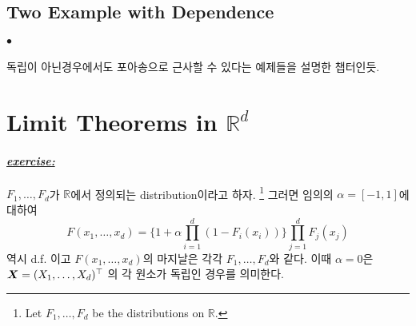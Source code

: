 \documentclass[12pt,oneside,english,a4paper]{article}
\def\ck{\paragraph{\Large$\bullet$}\Large}
\newcommand{\para}[1]{\paragraph{\Large\it\underline{\textbf{#1:}}}\Large}
\newcommand{\bsX}{\mbox{\boldmath $X$}}
\begin{document}
\subsection{Two Example with Dependence}
\ck 독립이 아닌경우에서도 포아송으로 근사할 수 있다는 예제들을 설명한 챕터인듯. 

\section{Limit Theorems in $\mathbb{R}^d$}
\para{exercise} $F_1,\dots,F_d$가 $\mathbb{R}$에서 정의되는 distribution이라고 하자. \footnote{Let $F_1,\dots,F_d$ be the distributions on $\mathbb{R}$.} 그러면 임의의 $\alpha=[-1,1]$에 대하여 
\[
F(x_1,\dots,x_d)=\bigg\{1+\alpha\prod_{i=1}^{d}(1-F_i(x_i))\bigg\}\prod_{j=1}^dF_j(x_j)
\]
역시 d.f. 이고 $F(x_1,\dots,x_d)$의 마지날은 각각 $F_1,\dots,F_d$와 같다. 이때 $\alpha=0$은 $\bsX=(X_1,\dots,X_d)^\top$ 의 각 원소가 독립인 경우를 의미한다. 
\end{document}
